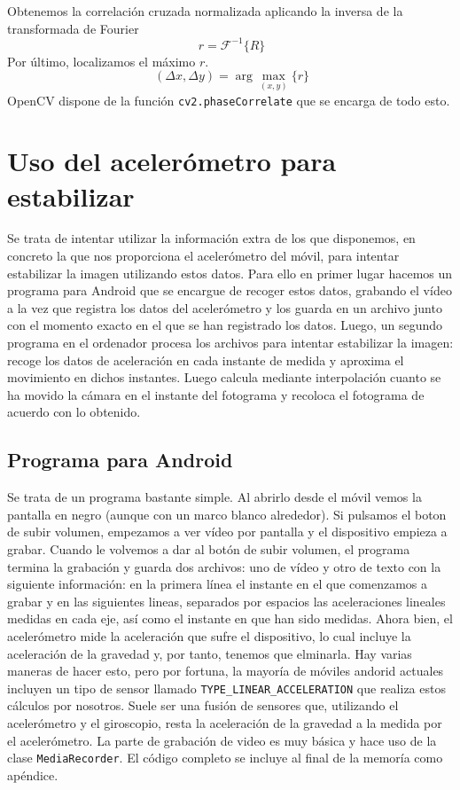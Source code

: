 \documentclass[a4paper,openright, 12pt]{book}
\begin{document}
Obtenemos la correlación cruzada normalizada aplicando la inversa de la transformada de Fourier
\begin{equation*}
    \ r = \mathcal{F}^{-1}\{R\}
\end{equation*}
Por último, localizamos el máximo  $r$.
\begin{equation*}
    \ (\Delta x, \Delta y) = \arg \max_{(x, y)}\{r\} 
\end{equation*}
OpenCV dispone de la función \lstinline|cv2.phaseCorrelate| que se encarga de todo esto.
\newpage
\section{Uso del acelerómetro para estabilizar}
Se trata de intentar utilizar la información extra de los que disponemos, en concreto la que nos proporciona el acelerómetro del móvil, para intentar estabilizar la imagen utilizando estos datos.
Para ello en primer lugar hacemos un programa para Android que se encargue de recoger estos datos, grabando el vídeo a la vez que registra los datos del acelerómetro y los guarda en un archivo junto con el momento exacto en el que se han registrado los datos.
Luego, un segundo programa en el ordenador procesa los archivos para intentar estabilizar la imagen: recoge los datos de aceleración en cada instante de medida y aproxima el movimiento en dichos instantes. Luego calcula mediante interpolación cuanto se ha movido la cámara en el instante del fotograma y recoloca el fotograma de acuerdo con lo obtenido.

\subsection{Programa para Android}
Se trata de un programa bastante simple. Al abrirlo desde el móvil vemos la pantalla en negro (aunque con un marco blanco alrededor). Si pulsamos el boton de subir volumen, empezamos a ver vídeo por pantalla y el dispositivo empieza a grabar. Cuando le volvemos a dar al botón de subir volumen, el programa termina la grabación y guarda dos archivos: uno de vídeo y otro de texto con la siguiente información: en la primera línea el instante en el que comenzamos a grabar y en las siguientes lineas, separados por espacios las aceleraciones lineales medidas en cada eje, así como el instante en que han sido medidas.
Ahora bien, el acelerómetro mide la aceleración que sufre el dispositivo, lo cual incluye la aceleración de la gravedad y, por tanto, tenemos que elminarla. Hay varias maneras de hacer esto, pero por fortuna, la mayoría de móviles andorid actuales incluyen un tipo de sensor llamado \lstinline|TYPE_LINEAR_ACCELERATION| que realiza estos cálculos por nosotros. Suele ser una fusión de sensores que, utilizando el acelerómetro y el giroscopio, resta la aceleración de la gravedad a la medida por el acelerómetro.
La parte de grabación de video es muy básica y hace uso de la clase \lstinline|MediaRecorder|.
El código completo se incluye al final de la memoría como apéndice.
\newpage
\end{document}
